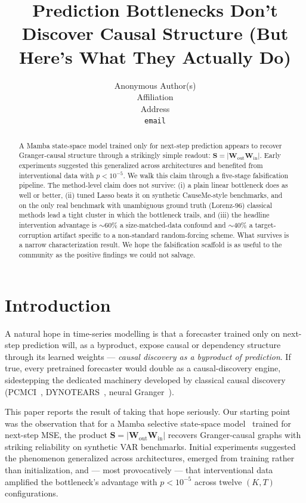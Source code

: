 \documentclass{article}
\title{Prediction Bottlenecks Don't Discover Causal Structure (But Here's What They Actually Do)}
\author{%
  Anonymous Author(s)\\
  Affiliation\\
  Address\\
  \texttt{email}\\
}
\begin{document}
\maketitle

\begin{abstract}
A Mamba state-space model trained only for next-step prediction appears to
recover Granger-causal structure through a strikingly simple readout:
$\mathbf{S} = |\mathbf{W}_{\text{out}} \mathbf{W}_{\text{in}}|$. Early
experiments suggested this generalized across architectures and benefited
from interventional data with $p < 10^{-5}$. We walk this claim through a
five-stage falsification pipeline. The method-level claim does not survive:
(i) a plain linear bottleneck does as well or better, (ii) tuned Lasso
beats it on synthetic CauseMe-style benchmarks, and on the only real
benchmark with unambiguous ground truth (Lorenz-96) classical methods
lead a tight cluster in which the bottleneck trails, and
(iii) the headline intervention advantage is $\sim$60\% a size-matched-data
confound and $\sim$40\% a target-corruption artifact specific to a
non-standard random-forcing scheme. What survives is a narrow
characterization result. We hope the falsification scaffold is as useful
to the community as the positive findings we could not salvage.
\end{abstract}

\section{Introduction}

A natural hope in time-series modelling is that a forecaster trained only
on next-step prediction will, as a byproduct, expose causal or dependency
structure through its learned weights — \emph{causal discovery as a
byproduct of prediction}. If true, every pretrained forecaster would
double as a causal-discovery engine, sidestepping the dedicated
machinery developed by classical causal discovery
(PCMCI~\citep{runge2019pcmci}, DYNOTEARS~\citep{pamfil2020dynotears},
neural Granger~\citep{tank2021neural,nauta2019causal}).

This paper reports the result of taking that hope seriously. Our starting
point was the observation that for a Mamba selective state-space
model~\citep{gu2023mamba} trained for next-step MSE, the product
$\mathbf{S} = |\mathbf{W}_{\text{out}} \mathbf{W}_{\text{in}}|$ recovers
Granger-causal graphs with striking reliability on synthetic VAR
benchmarks. Initial experiments suggested the phenomenon generalized
across architectures, emerged from training rather than initialization,
and — most provocatively — that interventional data amplified the
bottleneck's advantage with $p < 10^{-5}$ across twelve $(K, T)$
configurations.
\end{document}
